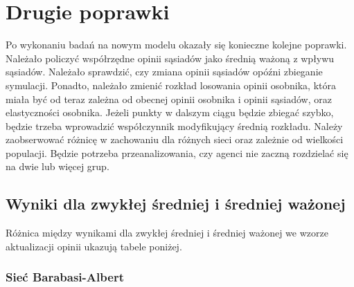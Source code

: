 \section{Drugie poprawki}

Po wykonaniu badań na nowym modelu okazały się konieczne kolejne poprawki.
Należało policzyć współrzędne opinii sąsiadów jako średnią ważoną z wpływu sąsiadów.
Należało sprawdzić, czy zmiana opinii sąsiadów opóźni zbieganie symulacji.
Ponadto, należało zmienić rozkład losowania opinii osobnika, która miała być od teraz zależna od obecnej opinii osobnika i opinii sąsiadów, oraz elastyczności osobnika.
Jeżeli punkty w dalszym ciągu będzie zbiegać szybko, będzie trzeba wprowadzić współczynnik modyfikujący średnią rozkładu.
Należy zaobserwować różnicę w zachowaniu dla różnych sieci oraz zależnie od wielkości populacji.
Będzie potrzeba przeanalizowania, czy agenci nie zaczną rozdzielać się na dwie lub więcej grup.

\subsection{Wyniki dla zwykłej średniej i średniej ważonej}

Różnica między wynikami dla zwykłej średniej i średniej ważonej we wzorze aktualizacji opinii ukazują tabele poniżej.

\subsubsection{Sieć Barabasi-Albert}

